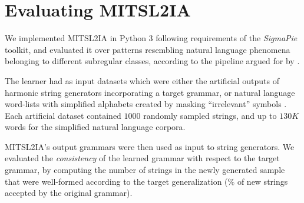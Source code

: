 \documentclass[11pt]{article}
\begin{document}

\section{Evaluating MITSL2IA}
    We implemented MITSL2IA in Python 3 following requirements of the \emph{SigmaPie} toolkit, and evaluated it  over patterns resembling natural language phenomena belonging to different subregular classes, according to the pipeline argued for by \citet{aksenova2020tool}.\@
    
    The learner had as input datasets which were either the artificial outputs of harmonic string generators incorporating a target grammar, or natural language word-lists with simplified alphabets created by masking ``irrelevant'' symbols \cite[for details see][]{aksenova2020tool}. 
    Each artificial dataset contained $1000$ randomly sampled strings, and up to $130K$ words for the simplified natural language corpora.\@
  
    MITSL2IA's output grammars were then used as input to string generators.\@
    We evaluated the \emph{consistency} of the learned grammar with respect to the target grammar, by computing the number of strings in the newly generated sample that were well-formed according to the target generalization ($\%$ of new strings accepted by the original grammar).\@
  
\end{document}
